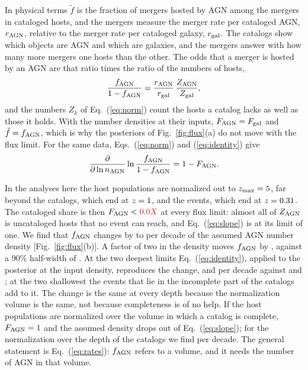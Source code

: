 \documentclass[aps,prd,reprint,twocolumn,superscriptaddress,nofootinbib,floatfix]{revtex4-2}
\newcommand{\fagn}{f_{\rm AGN}}
\newcommand{\nagn}{n_{\rm AGN}}
\providecommand{\NormFAGNMax}{\ph{0.0X}}               %
\providecommand{\SlopefAGNIdentityTwentyOne}{\ph{0.XX}} %
\providecommand{\SlopefAGNIdentityTwenty}{\ph{0.XX}}   %
\providecommand{\SlopefAGNDepthNorm}{\ph{0.XX}}        %
\newcommand{\req}[1]{#1}
\providecommand{\NormZmax}{\req{5}}
\begin{document}
In physical terms $\tilde f$ is the fraction of mergers hosted by AGN among
the mergers in cataloged hosts, and the mergers measure the merger rate per
cataloged AGN, $r_{\rm AGN}$, relative to the merger rate per cataloged
galaxy, $r_{\rm gal}$. The catalogs show which objects are AGN and which are
galaxies, and the mergers answer with how many more mergers one hosts than
the other. The odds that a merger is hosted by an AGN are that ratio times the
ratio of the numbers of hosts,
\begin{equation}
\frac{\fagn}{1-\fagn}=\frac{r_{\rm AGN}}{r_{\rm gal}}\,
\frac{Z_{\rm AGN}}{Z_{\rm gal}} ,
\label{eq:rates}
\end{equation}
and the numbers $Z_k$ of Eq.~(\ref{eq:norm}) count the hosts a catalog lacks
as well as those it holds. With the number densities at their inputs,
$F_{\rm AGN}=F_{\rm gal}$ and $\tilde f=\fagn$, which is why the posteriors
of Fig.~\ref{fig:flux}(a) do not move with the flux limit. For the same data,
Eqs.~(\ref{eq:norm}) and (\ref{eq:identity}) give
\begin{equation}
\frac{\partial}{\partial\ln\nagn}\ln\frac{\fagn}{1-\fagn}=1-F_{\rm AGN} .
\label{eq:slope}
\end{equation}

In the analyses here the host populations are normalized out to $z_{\rm
max}=\NormZmax$, far beyond the catalogs, which end at $z=1$, and
the events, which end at $z=0.31$. The cataloged share is then
$F_{\rm AGN}<\NormFAGNMax$ at every flux limit: almost all of $Z_{\rm AGN}$
is uncataloged hosts that no event can reach, and Eq.~(\ref{eq:slope}) is at
its limit of one. We find that $\fagn$ changes by \SlopefAGNMin{} to
\SlopefAGNMax{} per decade of the assumed AGN number density
[Fig.~\ref{fig:flux}(b)]. A factor of two in the density moves $\fagn$ by
\DeltafTwoTwentyOne, against a 90\% half-width of \FluxfHalfTwentyOne. At
the two deepest limits Eq.~(\ref{eq:identity}), applied to the posterior at
the input density, reproduces the change, \SlopefAGNIdentityTwentyOne{} and
\SlopefAGNIdentityTwenty{} per decade against \SlopefAGNTwentyOne{} and
\SlopefAGNTwenty; at the two shallowest the events that lie in the
incomplete part of the catalogs add to it. The change is the same at
every depth because the normalization volume is the same, not because
completeness is of no help. If the host populations are normalized over the
volume in which a catalog is complete, $F_{\rm AGN}=1$ and the assumed
density drops out of Eq.~(\ref{eq:slope}); for the normalization over the
depth of the catalogs we find \SlopefAGNDepthNorm{} per decade. The general
statement is Eq.~(\ref{eq:rates}): $\fagn$ refers to a volume, and it needs
the number of AGN in that volume.
\end{document}
